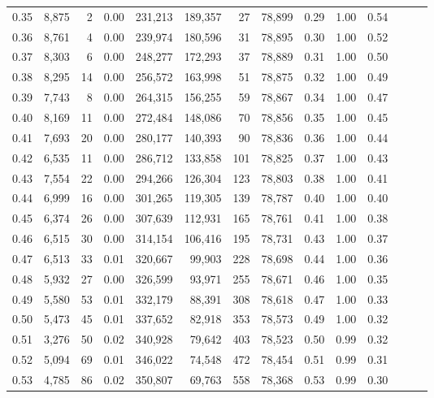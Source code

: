 \begin{tabular}{rrrrrrrrrrrrrr}
0.35 &  8,875 &      2 &  0.00 &  231,213 &  189,357 &      27 &  78,899 &  0.29 &  1.00 &      0.54 \\
0.36 &  8,761 &      4 &  0.00 &  239,974 &  180,596 &      31 &  78,895 &  0.30 &  1.00 &      0.52 \\
0.37 &  8,303 &      6 &  0.00 &  248,277 &  172,293 &      37 &  78,889 &  0.31 &  1.00 &      0.50 \\
0.38 &  8,295 &     14 &  0.00 &  256,572 &  163,998 &      51 &  78,875 &  0.32 &  1.00 &      0.49 \\
0.39 &  7,743 &      8 &  0.00 &  264,315 &  156,255 &      59 &  78,867 &  0.34 &  1.00 &      0.47 \\
0.40 &  8,169 &     11 &  0.00 &  272,484 &  148,086 &      70 &  78,856 &  0.35 &  1.00 &      0.45 \\
0.41 &  7,693 &     20 &  0.00 &  280,177 &  140,393 &      90 &  78,836 &  0.36 &  1.00 &      0.44 \\
0.42 &  6,535 &     11 &  0.00 &  286,712 &  133,858 &     101 &  78,825 &  0.37 &  1.00 &      0.43 \\
0.43 &  7,554 &     22 &  0.00 &  294,266 &  126,304 &     123 &  78,803 &  0.38 &  1.00 &      0.41 \\
0.44 &  6,999 &     16 &  0.00 &  301,265 &  119,305 &     139 &  78,787 &  0.40 &  1.00 &      0.40 \\
0.45 &  6,374 &     26 &  0.00 &  307,639 &  112,931 &     165 &  78,761 &  0.41 &  1.00 &      0.38 \\
0.46 &  6,515 &     30 &  0.00 &  314,154 &  106,416 &     195 &  78,731 &  0.43 &  1.00 &      0.37 \\
0.47 &  6,513 &     33 &  0.01 &  320,667 &   99,903 &     228 &  78,698 &  0.44 &  1.00 &      0.36 \\
0.48 &  5,932 &     27 &  0.00 &  326,599 &   93,971 &     255 &  78,671 &  0.46 &  1.00 &      0.35 \\
0.49 &  5,580 &     53 &  0.01 &  332,179 &   88,391 &     308 &  78,618 &  0.47 &  1.00 &      0.33 \\
0.50 &  5,473 &     45 &  0.01 &  337,652 &   82,918 &     353 &  78,573 &  0.49 &  1.00 &      0.32 \\
0.51 &  3,276 &     50 &  0.02 &  340,928 &   79,642 &     403 &  78,523 &  0.50 &  0.99 &      0.32 \\
0.52 &  5,094 &     69 &  0.01 &  346,022 &   74,548 &     472 &  78,454 &  0.51 &  0.99 &      0.31 \\
0.53 &  4,785 &     86 &  0.02 &  350,807 &   69,763 &     558 &  78,368 &  0.53 &  0.99 &      0.30 \\

\end{tabular}
